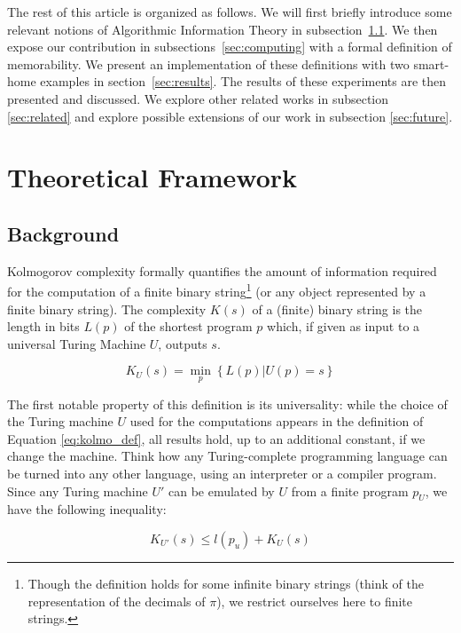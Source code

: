 \documentclass[entropy,article,submit,moreauthors,pdftex]{Definitions/mdpi}
\begin{document}
The rest of this article is organized as follows.
We will first briefly introduce
some relevant notions of Algorithmic Information Theory in subsection~\ref{sec:theory}. We then expose our contribution in subsections~\ref{sec:computing} with a formal definition of memorability. We present an implementation of these definitions with two smart-home examples in section~\ref{sec:results}. The results of these experiments are then presented and discussed. We explore other related works in subsection \ref{sec:related} and explore possible extensions of our work in subsection \ref{sec:future}.

\section{Theoretical Framework}
\label{sec:framework}

\subsection{Background}
\label{sec:theory}
Kolmogorov complexity formally quantifies the amount of information required
for the computation of a finite binary string\footnote{Though the definition
    holds for some infinite binary strings (think of the representation of the
    decimals of $\pi$), we restrict ourselves here to finite strings.} (or
any object represented by a finite binary
string)\cite{kolmogorov_three_1965,li_introduction_2008}. The complexity $K(s)$ of a (finite) binary string is the length in bits $L(p)$ of the shortest program $p$
which, if given as input to a universal Turing Machine $U$, outputs $s$.

\begin{equation}
    \label{eq:kolmo_def}
    K_{U}(s) = \min_{p}\left\{L(p)|U(p)=s\right\}
\end{equation}

The first notable property of this definition is its universality: while the
choice of the Turing machine $U$ used for the computations appears in the
definition of Equation \ref{eq:kolmo_def}, all results hold, up to an additional
constant, if we change the machine. Think how any Turing-complete programming language can
be turned into any other language, using an interpreter or a compiler program. Since any
Turing machine $U'$ can be emulated by $U$ from a
finite program $p_{U}$, we have the following inequality:

\begin{equation}
    \label{eq:inequality_univ}
    K_{U'}(s) \le l(p_{u}) + K_{U}(s)
\end{equation}
\end{document}
